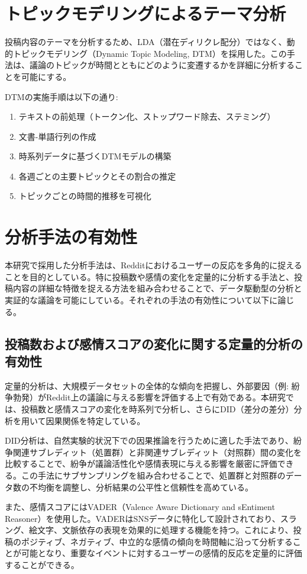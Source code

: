 \documentclass[11pt, a4j]{jreport}
\begin{document}
    \section{トピックモデリングによるテーマ分析}
    投稿内容のテーマを分析するため、LDA（潜在ディリクレ配分）ではなく、動的トピックモデリング（Dynamic Topic Modeling, DTM）を採用した。この手法は、議論のトピックが時間とともにどのように変遷するかを詳細に分析することを可能にする。

    DTMの実施手順は以下の通り:
    \begin{enumerate}
        \item テキストの前処理（トークン化、ストップワード除去、ステミング）
        \item 文書-単語行列の作成
        \item 時系列データに基づくDTMモデルの構築
        \item 各週ごとの主要トピックとその割合の推定
        \item トピックごとの時間的推移を可視化
    \end{enumerate}

    \section{分析手法の有効性}
    本研究で採用した分析手法は、Redditにおけるユーザーの反応を多角的に捉えることを目的としている。特に投稿数や感情の変化を定量的に分析する手法と、投稿内容の詳細な特徴を捉える方法を組み合わせることで、データ駆動型の分析と実証的な議論を可能にしている。それぞれの手法の有効性について以下に論じる。

    \subsection{投稿数および感情スコアの変化に関する定量的分析の有効性}
    定量的分析は、大規模データセットの全体的な傾向を把握し、外部要因（例: 紛争勃発）がReddit上の議論に与える影響を評価する上で有効である。本研究では、投稿数と感情スコアの変化を時系列で分析し、さらにDID（差分の差分）分析を用いて因果関係を特定している。

    DID分析は、自然実験的状況下での因果推論を行うために適した手法であり、紛争関連サブレディット（処置群）と非関連サブレディット（対照群）間の変化を比較することで、紛争が議論活性化や感情表現に与える影響を厳密に評価できる。この手法にサブサンプリングを組み合わせることで、処置群と対照群のデータ数の不均衡を調整し、分析結果の公平性と信頼性を高めている。

    また、感情スコアにはVADER（Valence Aware Dictionary and sEntiment Reasoner）を使用した。VADERはSNSデータに特化して設計されており、スラング、絵文字、文脈依存の表現を効果的に処理する機能を持つ。これにより、投稿のポジティブ、ネガティブ、中立的な感情の傾向を時間軸に沿って分析することが可能となり、重要なイベントに対するユーザーの感情的反応を定量的に評価することができる。
\end{document}
